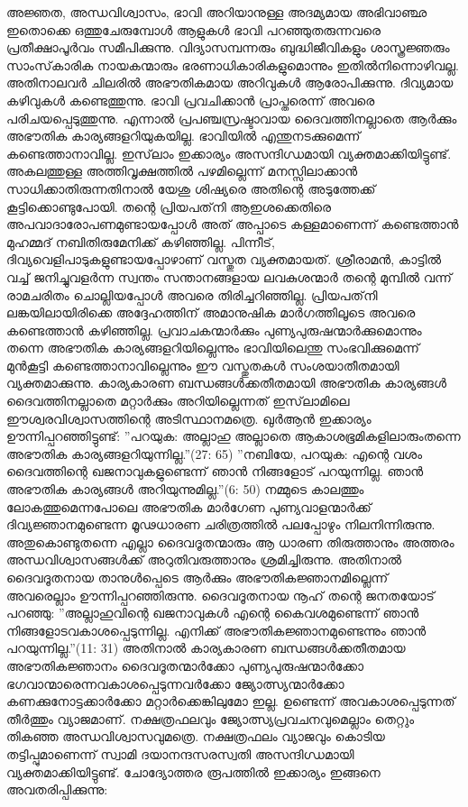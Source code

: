 അജ്ഞത, അന്ധവിശ്വാസം, ഭാവി അറിയാനുള്ള അദമ്യമായ അഭിവാഞ്ഛ ഇതൊക്കെ ഒത്തുചേരുമ്പോള്‍ ആളുകള്‍ ഭാവി പറഞ്ഞുതരുന്നവരെ പ്രതീക്ഷാപൂര്‍വം സമീപിക്കുന്നു. വിദ്യാസമ്പന്നരും ബുദ്ധിജീവികളും ശാസ്ത്രജ്ഞരും സാംസ്‌കാരിക നായകന്മാരും ഭരണാധികാരികളുമൊന്നും ഇതില്‍നിന്നൊഴിവല്ല. അതിനാലവര്‍ ചിലരില്‍ അഭൗതികമായ അറിവുകള്‍ ആരോപിക്കുന്നു. ദിവ്യമായ കഴിവുകള്‍ കണ്ടെത്തുന്നു. ഭാവി പ്രവചിക്കാന്‍ പ്രാപ്തരെന്ന് അവരെ പരിചയപ്പെടുത്തുന്നു. എന്നാല്‍ പ്രപഞ്ചസ്രഷ്ടാവായ ദൈവത്തിനല്ലാതെ ആര്‍ക്കും അഭൗതിക കാര്യങ്ങളറിയുകയില്ല. ഭാവിയില്‍ എന്തുനടക്കുമെന്ന് കണ്ടെത്താനാവില്ല. ഇസ്‌ലാം ഇക്കാര്യം അസന്ദിഗ്ധമായി വ്യക്തമാക്കിയിട്ടുണ്ട്. അകലത്തുള്ള അത്തിവൃക്ഷത്തില്‍ പഴമില്ലെന്ന് മനസ്സിലാക്കാന്‍ സാധിക്കാതിരുന്നതിനാല്‍ യേശു ശിഷ്യരെ അതിന്റെ അടുത്തേക്ക് കൂട്ടിക്കൊണ്ടുപോയി. തന്റെ പ്രിയപത്‌നി ആഇശക്കെതിരെ അപവാദാരോപണമുണ്ടായപ്പോള്‍ അത് അപ്പാടെ കള്ളമാണെന്ന് കണ്ടെത്താന്‍ മുഹമ്മദ് നബിതിരുമേനിക്ക് കഴിഞ്ഞില്ല. പിന്നീട്, ദിവ്യവെളിപാടുകളുണ്ടായപ്പോഴാണ് വസ്തുത വ്യക്തമായത്. ശ്രീരാമന്‍, കാട്ടില്‍ വച്ച് ജനിച്ചുവളര്‍ന്ന സ്വന്തം സന്താനങ്ങളായ ലവകുശന്മാര്‍ തന്റെ മുമ്പില്‍ വന്ന് രാമചരിതം ചൊല്ലിയപ്പോള്‍ അവരെ തിരിച്ചറിഞ്ഞില്ല. പ്രിയപത്‌നി ലങ്കയിലായിരിക്കെ അദ്ദേഹത്തിന് അമാനുഷിക മാര്‍ഗത്തിലൂടെ അവരെ കണ്ടെത്താന്‍ കഴിഞ്ഞില്ല. പ്രവാചകന്മാര്‍ക്കും പുണ്യപുരുഷന്മാര്‍ക്കുമൊന്നും തന്നെ അഭൗതിക കാര്യങ്ങളറിയില്ലെന്നും ഭാവിയിലെന്തു സംഭവിക്കുമെന്ന് മുന്‍കൂട്ടി കണ്ടെത്താനാവില്ലെന്നും ഈ വസ്തുതകള്‍ സംശയാതീതമായി വ്യക്തമാക്കുന്നു.
കാര്യകാരണ ബന്ധങ്ങള്‍ക്കതീതമായി അഭൗതിക കാര്യങ്ങള്‍ ദൈവത്തിനല്ലാതെ മറ്റാര്‍ക്കും അറിയില്ലെന്നത് ഇസ്‌ലാമിലെ ഈശ്വരവിശ്വാസത്തിന്റെ അടിസ്ഥാനമത്രെ. ഖുര്‍ആന്‍ ഇക്കാര്യം ഊന്നിപ്പറഞ്ഞിട്ടുണ്ട്:
''പറയുക: അല്ലാഹു അല്ലാതെ ആകാശഭൂമികളിലാരുംതന്നെ അഭൗതിക കാര്യങ്ങളറിയുന്നില്ല.''(27: 65)
''നബിയേ, പറയുക: എന്റെ വശം ദൈവത്തിന്റെ ഖജനാവുകളുണ്ടെന്ന് ഞാന്‍ നിങ്ങളോട് പറയുന്നില്ല. ഞാന്‍ അഭൗതിക കാര്യങ്ങള്‍ അറിയുന്നുമില്ല.''(6: 50)
നമ്മുടെ കാലത്തും ലോകത്തുമെന്നപോലെ അഭൗതിക മാര്‍ഗേണ പുണ്യവാളന്മാര്‍ക്ക് ദിവ്യജ്ഞാനമുണ്ടെന്ന മൂഢധാരണ ചരിത്രത്തില്‍ പലപ്പോഴും നിലനിന്നിരുന്നു. അതുകൊണ്ടുതന്നെ എല്ലാ ദൈവദൂതന്മാരും ആ ധാരണ തിരുത്താനും അത്തരം അന്ധവിശ്വാസങ്ങള്‍ക്ക് അറുതിവരുത്താനും ശ്രമിച്ചിരുന്നു. അതിനാല്‍ ദൈവദൂതനായ താനുള്‍പ്പെടെ ആര്‍ക്കും അഭൗതികജ്ഞാനമില്ലെന്ന് അവരെല്ലാം ഊന്നിപ്പറഞ്ഞിരുന്നു. ദൈവദൂതനായ നൂഹ് തന്റെ ജനതയോട് പറഞ്ഞു: ''അല്ലാഹുവിന്റെ ഖജനാവുകള്‍ എന്റെ കൈവശമുണ്ടെന്ന് ഞാന്‍ നിങ്ങളോടവകാശപ്പെടുന്നില്ല. എനിക്ക് അഭൗതികജ്ഞാനമുണ്ടെന്നും ഞാന്‍ പറയുന്നില്ല.''(11: 31)
അതിനാല്‍ കാര്യകാരണ ബന്ധങ്ങള്‍ക്കതീതമായ അഭൗതികജ്ഞാനം ദൈവദൂതന്മാര്‍ക്കോ പുണ്യപുരുഷന്മാര്‍ക്കോ ഭഗവാന്മാരെന്നവകാശപ്പെടുന്നവര്‍ക്കോ ജ്യോത്സ്യന്മാര്‍ക്കോ കണക്കുനോട്ടക്കാര്‍ക്കോ മറ്റാര്‍ക്കെങ്കിലുമോ ഇല്ല. ഉണ്ടെന്ന് അവകാശപ്പെടുന്നത് തീര്‍ത്തും വ്യാജമാണ്. നക്ഷത്രഫലവും ജ്യോത്സ്യപ്രവചനവുമെല്ലാം തെറ്റും തികഞ്ഞ അന്ധവിശ്വാസവുമത്രെ.
നക്ഷത്രഫലം വ്യാജവും കൊടിയ തട്ടിപ്പുമാണെന്ന് സ്വാമി ദയാനന്ദസരസ്വതി അസന്ദിഗ്ധമായി വ്യക്തമാക്കിയിട്ടുണ്ട്. ചോദ്യോത്തര രൂപത്തില്‍ ഇക്കാര്യം ഇങ്ങനെ അവതരിപ്പിക്കുന്നു:\\
